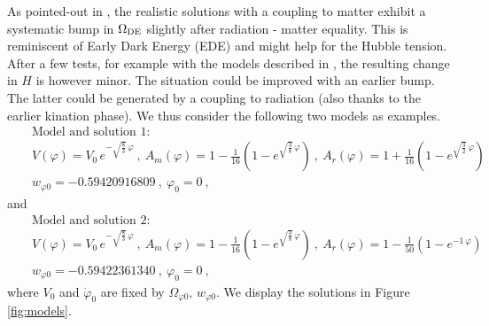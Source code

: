 \documentclass[11pt,a4paper,english,twoside]{article}
\newcommand{\nn}{\nonumber}
\def\bea{\begin{eqnarray}}
\def\eea{\end{eqnarray}}
\begin{document}
As pointed-out in \cite{Andriot:2025los}, the realistic solutions with a coupling to matter exhibit a systematic bump in $\Omega_{{\rm DE}}$ slightly after radiation - matter equality. This is reminiscent of Early Dark Energy (EDE) and might help for the Hubble tension. After a few tests, for example with the models described in \cite[Fig. 6]{Andriot:2026lac}, the resulting change in $H$ is however minor. The situation could be improved with an earlier bump. The latter could be generated by a coupling to radiation (also thanks to the earlier kination phase). We thus consider the following two models as examples.
\bea
&&\text{Model and solution 1:} \label{model1}\\
&& V(\varphi)= V_0 \, e^{- \sqrt{\frac83}\, \varphi} \ ,\ A_m(\varphi)= 1 - \frac{1}{16} \left(1-e^{\sqrt{\frac38}\, \varphi}\right) \ ,\ A_r(\varphi) = 1 + \frac{1}{16} \left(1- e^{\sqrt{\frac32}\, \varphi} \right)\nn\\
&& w_{\varphi0} = -0.59420916809 \ ,\ \varphi_0 =0 \ ,\nn
\eea
and
\bea
&&\text{Model and solution 2:} \label{model2}\\
&& V(\varphi)= V_0 \, e^{- \sqrt{\frac83}\, \varphi} \ ,\ A_m(\varphi)= 1 - \frac{1}{16} \left(1-e^{\sqrt{\frac38}\, \varphi}\right) \ ,\ A_r(\varphi) = 1 - \frac{1}{50} \left(1- e^{-1\, \varphi} \right)\nn\\
&& w_{\varphi0} = -0.59422361340 \ ,\ \varphi_0 =0 \ ,\nn
\eea
where $V_0$ and $\dot{\varphi}_0$ are fixed by $\Omega_{\varphi0},\, w_{\varphi0}$. We display the solutions in Figure \ref{fig:models}.
\end{document}
